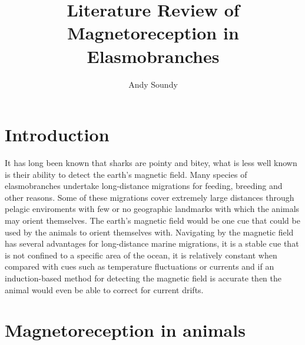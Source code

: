 \documentclass[12pt]{article}
\title{Literature Review of Magnetoreception in Elasmobranches}
\author{Andy Soundy}
\begin{document}
\maketitle

\section{Introduction}

It has long been known that sharks are pointy and bitey, what is less well known is their ability to detect the earth's magnetic field. Many species of elasmobranches undertake long-distance migrations for feeding, breeding and other reasons\cite{Stevens:1976}\cite{Carey:1990}\cite{Bonfil:2005}. Some of these migrations cover extremely large distances through pelagic enviroments with few or no geographic landmarks with which the animals may orient themselves\cite{Bonfil:2005}. The earth's magnetic field would be one cue that could be used by the animals to orient themselves with. Navigating by the magnetic field has several advantages for long-distance marine migrations, it is a stable cue that is not confined to a specific area of the ocean, it is relatively constant when compared with cues such as temperature fluctuations or currents and if an induction-based method for detecting the magnetic field is accurate then the animal would even be able to correct for current drifts\cite{Paulin:1995}.  

\section{Magnetoreception in animals}
\label{sec:examples}
\end{document}
